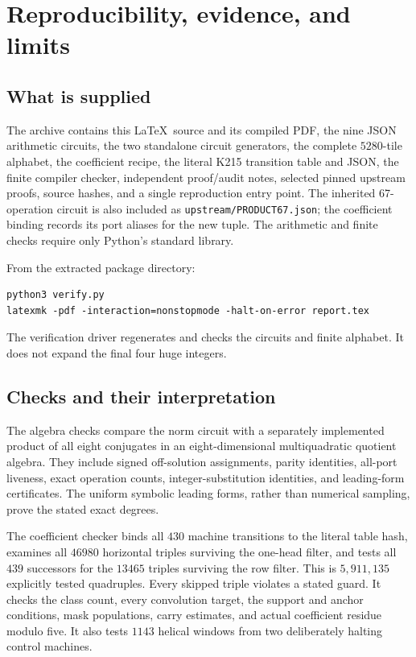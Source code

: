 \documentclass[11pt]{article}
\theoremstyle{remark}\newtheorem{remark}[theorem]{Remark}
\begin{document}
\section{Reproducibility, evidence, and limits}\label{sec:repro}

\subsection{What is supplied}

The archive contains this \LaTeX\ source and its compiled PDF,
the nine JSON arithmetic circuits, the two standalone circuit generators,
the complete \(5280\)-tile alphabet, the coefficient recipe,
the literal K215 transition table and JSON, the finite compiler
checker, independent proof/audit notes, selected pinned upstream
proofs, source hashes, and a single reproduction entry point.
The inherited 67-operation circuit is also included as
\texttt{upstream/PRODUCT67.json}; the coefficient binding records its
port aliases for the new tuple.
The arithmetic and finite checks require only Python's standard library.

From the extracted package directory:
\begin{verbatim}
python3 verify.py
latexmk -pdf -interaction=nonstopmode -halt-on-error report.tex
\end{verbatim}
The verification driver regenerates and checks the circuits and finite
alphabet. It does not expand the final four huge integers.

\subsection{Checks and their interpretation}

The algebra checks compare the norm circuit with a separately
implemented product of all eight conjugates in an eight-dimensional
multiquadratic quotient algebra. They include signed off-solution
assignments, parity identities, all-port liveness, exact operation
counts, integer-substitution identities, and leading-form certificates.
The uniform symbolic leading forms, rather than numerical sampling,
prove the stated exact degrees.

The coefficient checker binds all \(430\) machine transitions to the
literal table hash, examines all \(46980\) horizontal triples surviving
the one-head filter, and tests all \(439\) successors for the \(13465\)
triples surviving the row filter. This is \(5,911,135\) explicitly
tested quadruples. Every skipped triple violates a stated guard.
It checks the class count, every convolution target, the support and
anchor conditions, mask populations, carry estimates, and actual
coefficient residue modulo five. It also tests \(1143\) helical
windows from two deliberately halting control machines.
\end{document}
